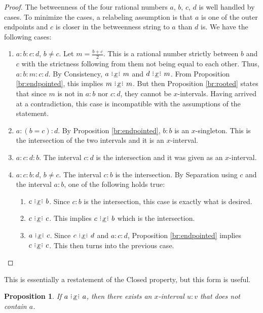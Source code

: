 \documentclass[12pt]{article}
\newtheorem{proposition}{Proposition}[section]
\begin{document}
\begin{proof}
    The betweenness of the four rational numbers $a$, $b$, $c$, $d$ is well handled by cases. To minimize the cases, a relabeling assumption is that $a$ is one of the outer endpoints and $c$ is closer in the betweenness string to $a$ than $d$ is. We have the following cases: 

    \begin{enumerate}
        \item $a:b:c:d$, $b \neq c$. Let $m = \frac{b+c}{2}$. This is a rational number strictly between $b$ and $c$ with the strictness following from them not being equal to each other. Thus, $a:b:m:c:d$. By Consistency, $a\xrel m$ and $d \xrel m$. From Proposition \ref{br:endpointed}, this implies $m \xrel m$. But then Proposition \ref{br:rooted} states that since $m$ is not in $a:b$ nor $c:d$, they cannot be $x$-intervals. Having arrived at a contradiction, this case is incompatible with the assumptions of the statement. 
        \item $a:(b=c):d$. By Proposition \ref{br:endpointed}, $b:b$ is an $x$-singleton. This is the intersection of the two intervals and it is an $x$-interval. 
        \item $a:c:d:b$. The interval $c:d$ is the intersection and it was given as an $x$-interval. 
        \item $a:c:b:d$, $b \neq c$. The interval $c:b$ is the intersection. By Separation using $c$ and the interval $a:b$, one of the following holds true: 
        \begin{enumerate}
            \item $c \xrel b$. Since $c:b$ is the intersection, this case is exactly what is desired.
            \item $c \xrel c$. This implies $c \xrel b$ which is the intersection. 
            \item $a \xrel c$. Since $c \xrel d$ and $a:c:d$, Proposition \ref{br:endpointed} implies $c \xrel c$. This then turns into the previous case. 
        \end{enumerate}
    \end{enumerate}
\end{proof}

This is essentially a restatement of the Closed property, but this form is useful. 

\begin{proposition}\label{br:not-rooted-separated}
    If \sout{$a \xrel a$}, then there exists an $x$-interval $u:v$ that does not contain $a$. 
\end{proposition}
\end{document}
